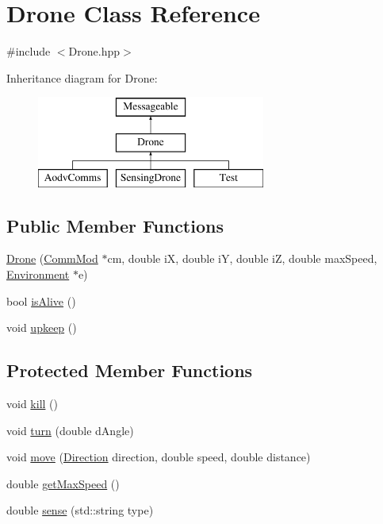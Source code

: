 \hypertarget{class_drone}{}\section{Drone Class Reference}
\label{class_drone}


{\ttfamily \#include $<$Drone.\+hpp$>$}

Inheritance diagram for Drone\+:\begin{figure}[H]
\begin{center}
\leavevmode
\includegraphics[height=3.000000cm]{class_drone}
\end{center}
\end{figure}
\subsection*{Public Member Functions}
\begin{DoxyCompactItemize}
\item 
\hyperlink{class_drone_a671923cbf775d479aa11f469b82503f3}{Drone} (\hyperlink{class_comm_mod}{Comm\+Mod} $\ast$cm, double iX, double iY, double iZ, double max\+Speed, \hyperlink{class_environment}{Environment} $\ast$e)
\item 
bool \hyperlink{class_drone_a5181059ce456e7ccdf3366ee1f8156db}{is\+Alive} ()
\item 
void \hyperlink{class_drone_a4a53691055a0561e5069ea1482ac893b}{upkeep} ()
\end{DoxyCompactItemize}
\subsection*{Protected Member Functions}
\begin{DoxyCompactItemize}
\item 
void \hyperlink{class_drone_a87b644ed6c297252a0930b4a915a553e}{kill} ()
\item 
void \hyperlink{class_drone_a81c5a726112abba3d686e95baccd54be}{turn} (double d\+Angle)
\item 
void \hyperlink{class_drone_ae7ebc3df04a42e9c49389ab2868d102d}{move} (\hyperlink{_drone_8hpp_a224b9163917ac32fc95a60d8c1eec3aa}{Direction} direction, double speed, double distance)
\item 
double \hyperlink{class_drone_a780e43c6486a26eb47a37295ea510269}{get\+Max\+Speed} ()
\item 
double \hyperlink{class_drone_abd485e52d2ac2d6d81038665495bb480}{sense} (std\+::string type)
\end{DoxyCompactItemize}
